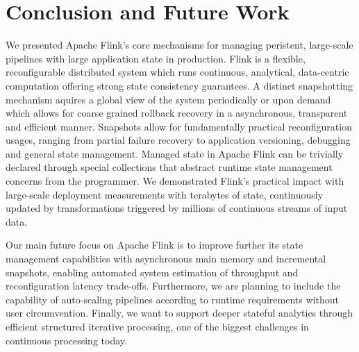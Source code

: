 
\section{Conclusion and Future Work}

We presented Apache Flink's core mechanisms for managing peristent, large-scale pipelines with large application state in production. Flink is a flexible, reconfigurable distributed system which runs continuous, analytical, data-centric computation offering strong state consistency guarantees. A distinct snapshotting mechanism aquires a global view of the system periodically or upon demand which allows for coarse grained rollback recovery in a asynchronous, transparent and efficient manner. Snapshots allow for fundamentally practical reconfiguration usages, ranging from partial failure recovery to application versioning, debugging and general state management. Managed state in Apache Flink can be trivially declared through special collections that abstract runtime state management concerns from the programmer. We demonstrated Flink's practical impact with large-scale deployment measurements with terabytes of state, continuously updated by transformations triggered by millions of continuous streams of input data.

Our main future focus on Apache Flink is to improve further its state management capabilities with asynchronous main memory and incremental snapshots, enabling automated system estimation of throughput and reconfiguration latency trade-offs. Furthermore, we are planning to include the capability of auto-scaling pipelines according to runtime requirements without user circumvention. Finally, we want to support deeper stateful analytics through efficient structured iterative processing, one of the biggest challenges in continuous processing today.